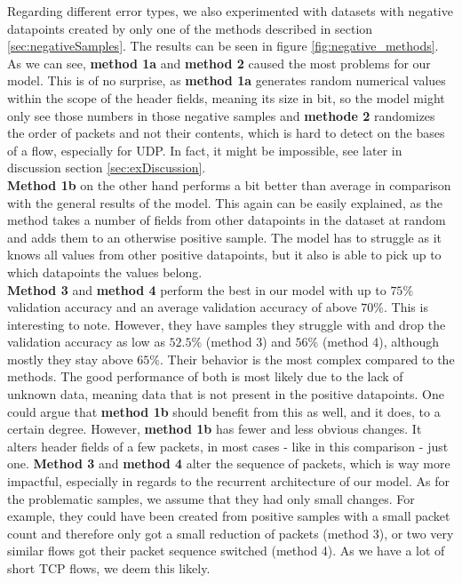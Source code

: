 \documentclass[
	ngerman,
	ruledheaders=section,%
	class=report,%
	thesis={type=bachelor},%
	accentcolor=9c,%
	custommargins=true,%
	marginpar=false,%
	parskip=half-,%
	fontsize=11pt,%
	twoside
]{tudapub}
\begin{document}
Regarding different error types, we also experimented with datasets with negative datapoints created by only one of the methods described in section \ref{sec:negativeSamples}.
The results can be seen in figure \ref{fig:negative_methods}.
As we can see, \textbf{method 1a} and \textbf{method 2} caused the most problems for our model.
This is of no surprise, as \textbf{method 1a} generates random numerical values within the scope of the header fields, meaning its size in bit, so the model might only see those numbers in those negative samples and \textbf{methode 2} randomizes the order of packets and not their contents, which is hard to detect on the bases of a flow, especially for UDP.
In fact, it might be impossible, see later in discussion section \ref{sec:exDiscussion}.\\
\textbf{Method 1b} on the other hand performs a bit better than average in comparison with the general results of the model.
This again can be easily explained, as the method takes a number of fields from other datapoints in the dataset at random and adds them to an otherwise positive sample.
The model has to struggle as it knows all values from other positive datapoints, but it also is able to pick up to which datapoints the values belong.\\
\textbf{Method 3} and \textbf{method 4} perform the best in our model with up to $75\%$ validation accuracy and an average validation accuracy of above $70\%$.
This is interesting to note.
However, they have samples they struggle with and drop the validation accuracy as low as $52.5\%$ (method 3) and $56\%$ (method 4), although mostly they stay above $65\%$.
Their behavior is the most complex compared to the methods.
The good performance of both is most likely due to the lack of unknown data, meaning data that is not present in the positive datapoints.
One could argue that \textbf{method 1b} should benefit from this as well, and it does, to a certain degree.
However, \textbf{method 1b} has fewer and less obvious changes. It alters header fields of a few packets, in most cases - like in this comparison - just one.
\textbf{Method 3} and \textbf{method 4} alter the sequence of packets, which is way more impactful, especially in regards to the recurrent architecture of our model.
As for the problematic samples, we assume that they had only small changes.
For example, they could have been created from positive samples with a small packet count and therefore only got a small reduction of packets (method 3), or two very similar flows got their packet sequence switched (method 4).
As we have a lot of short TCP flows, we deem this likely.
\end{document}
